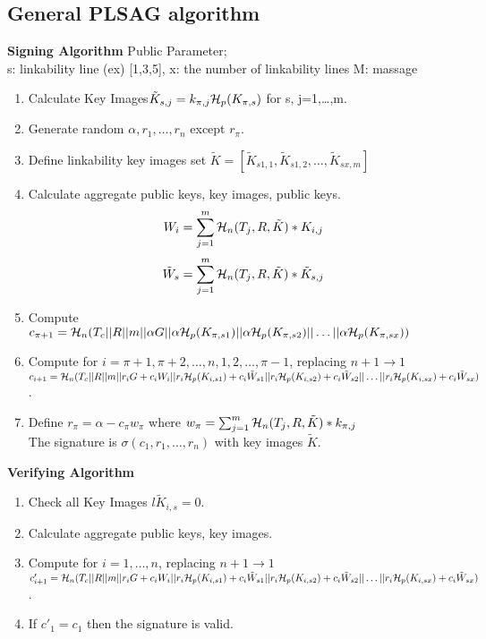 \subsection{General PLSAG algorithm}
    \textbf{Signing Algorithm}
    Public Parameter;\\ 
    s: linkability line (ex) [1,3,5],  x: the number of linkability lines M: massage
    \begin{enumerate}
        \item Calculate Key Images$\tilde{K}_{s,j}=k_{\pi,j}{\cal H}_{p} (K_{\pi,s})$ for s, j=1,\ldots,m.
        \item Generate random $\alpha,r_{1},\ldots,r_{n}$ except $r_{\pi}$.
        \item Define linkability key images set $\tilde{K}=[\tilde{K}_{s1,1},\tilde{K}_{s1,2},\ldots,\tilde{K}_{sx,m}]$
        \item Calculate aggregate public keys, key images, public keys.
         $$ W_{i}= \sum^{m}_{j=1} {\cal H}_{n}(T_{j},R,\tilde{K})*K_{i,j} $$
        $$ \tilde{W}_{s}= \sum^{m}_{j=1} {\cal H}_{n}(T_{j},R,\tilde{K})*\tilde{K}_{s,j} $$
        \item Compute $c_{\pi+1}={\cal H}_{n}(T_{c}||R||m||\alpha G||\alpha {\cal H}_{p}(K_{\pi,s1})||\alpha {\cal H}_{p}(K_{\pi,s2})||\ldots||\alpha {\cal H}_{p}(K_{\pi,sx})) $
        \item Compute for $i=\pi +1,\pi +2,\ldots,n,1,2,\ldots,\pi -1$, replacing $n+1 \rightarrow 1$\\
        $c_{i+1}={\cal H}_{n}(T_{c}||R||m||r_{i}G+c_{i}W_{i}||r_{i}{\cal H}_{p}(K_{i,s1})+c_{i} \tilde{W}_{s1}||r_{i}{\cal H}_{p}(K_{i,s2})+c_{i} \tilde{W}_{s2}||\ldots||r_{i}{\cal H}_{p}(K_{i,sx})+c_{i} \tilde{W}_{sx}) $.
        \item Define $r_{\pi}=\alpha - c_{\pi} w_{\pi}$ where $w_{\pi}=\sum^{m}_{j=1} {\cal H}_{n}(T_{j},R,\tilde{K})*k_{\pi,j}$\\
        The signature is $\sigma (c_{1},r_{1},\ldots,r_{n})$ with key images $\tilde{K}$.
    \end{enumerate}
    
    \textbf{Verifying Algorithm}
    \begin{enumerate}
        \item Check all Key Images $l\tilde{K}_{i,s}=0$.
        \item Calculate aggregate public keys, key images.
        \item Compute for $i=1,\ldots,n$, replacing $n+1 \rightarrow 1$\\
        $c'_{i+1}={\cal H}_{n}(T_{c}||R||m||r_{i}G+c_{i}W_{i}||r_{i}{\cal H}_{p}(K_{i,s1})+c_{i} \tilde{W}_{s1}||r_{i}{\cal H}_{p}(K_{i,s2})+c_{i} \tilde{W}_{s2}||\ldots||r_{i}{\cal H}_{p}(K_{i,sx})+c_{i} \tilde{W}_{sx}) $.
        \item If $c'_{1}=c_{1}$ then the signature is valid.
    \end{enumerate}
    
